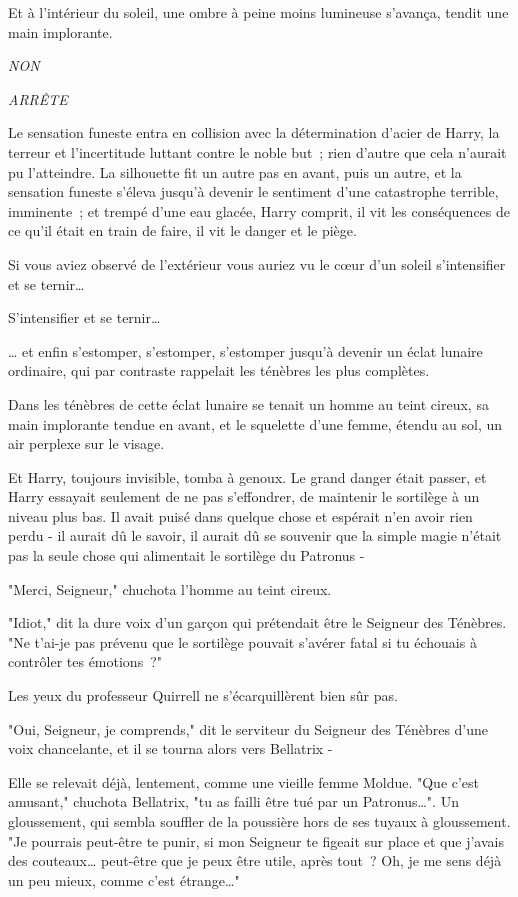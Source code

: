 Et à l'intérieur du soleil, une ombre à peine moins lumineuse s'avança, tendit une main implorante.

\emph{NON}

\emph{ARRÊTE}

Le sensation funeste entra en collision avec la détermination d'acier de Harry, la terreur et l'incertitude luttant contre le noble but~; rien d'autre que cela n'aurait pu l'atteindre. La silhouette fit un autre pas en avant, puis un autre, et la sensation funeste s'éleva jusqu'à devenir le sentiment d'une catastrophe terrible, imminente~; et trempé d'une eau glacée, Harry comprit, il vit les conséquences de ce qu'il était en train de faire, il vit le danger et le piège.

Si vous aviez observé de l'extérieur vous auriez vu le cœur d'un soleil s'intensifier et se ternir…

S'intensifier et se ternir…

… et enfin s'estomper, s'estomper, s'estomper jusqu'à devenir un éclat lunaire ordinaire, qui par contraste rappelait les ténèbres les plus complètes.

Dans les ténèbres de cette éclat lunaire se tenait un homme au teint cireux, sa main implorante tendue en avant, et le squelette d'une femme, étendu au sol, un air perplexe sur le visage.

Et Harry, toujours invisible, tomba à genoux. Le grand danger était passer, et Harry essayait seulement de ne pas s'effondrer, de maintenir le sortilège à un niveau plus bas. Il avait puisé dans quelque chose et espérait n'en avoir rien perdu - il aurait dû le savoir, il aurait dû se souvenir que la simple magie n'était pas la seule chose qui alimentait le sortilège du Patronus -

"Merci, Seigneur," chuchota l'homme au teint cireux.

"Idiot," dit la dure voix d'un garçon qui prétendait être le Seigneur des Ténèbres. "Ne t'ai-je pas prévenu que le sortilège pouvait s'avérer fatal si tu échouais à contrôler tes émotions~?"

Les yeux du professeur Quirrell ne s'écarquillèrent bien sûr pas.

"Oui, Seigneur, je comprends," dit le serviteur du Seigneur des Ténèbres d'une voix chancelante, et il se tourna alors vers Bellatrix -

Elle se relevait déjà, lentement, comme une vieille femme Moldue. "Que c'est amusant," chuchota Bellatrix, "tu as failli être tué par un Patronus…". Un gloussement, qui sembla souffler de la poussière hors de ses tuyaux à gloussement. "Je pourrais peut-être te punir, si mon Seigneur te figeait sur place et que j'avais des couteaux… peut-être que je peux être utile, après tout~? Oh, je me sens déjà un peu mieux, comme c'est étrange…"

